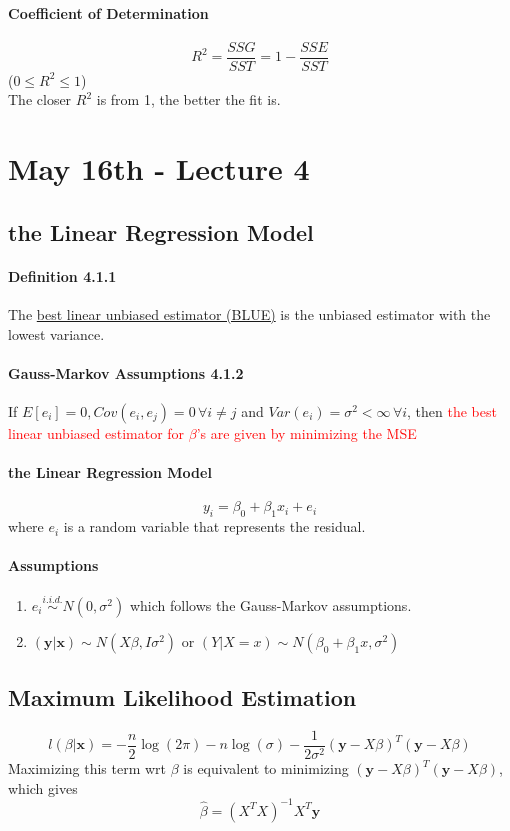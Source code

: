 \documentclass[11pt]{article}
\newcommand{\tb}[1]{\textbf{#1}}
\newcommand{\under}[1]{\underline{#1}}
\newcommand{\vx}[0]{\tb{x}}
\newcommand{\vy}[0]{\tb{y}}
\begin{document}
\paragraph{Coefficient of Determination}
$$R^2 = \frac{SSG}{SST} = 1- \frac{SSE}{SST}$$
($0 \leq R^2 \leq 1$)\\
The closer $R^2$ is from 1, the better the fit is.
\section{May 16th - Lecture 4}
\subsection{the Linear Regression Model}
\paragraph{Definition 4.1.1}
The \under{best linear unbiased estimator (BLUE)} is the unbiased estimator with the lowest variance.
\paragraph{Gauss-Markov Assumptions 4.1.2}
If $E[e_i] = 0, Cov(e_i, e_j) = 0 \, \forall i \neq j$ and $Var(e_i) = \sigma^2 < \infty \, \forall i$, then \textcolor{red}{the best linear unbiased estimator for $\beta$'s are given by minimizing the MSE}
\paragraph{the Linear Regression Model}
$$y_i = \beta_0 + \beta_1x_i + e_i$$
where $e_i$ is a random variable that represents the residual. \\
\paragraph{Assumptions}
\begin{enumerate}
    \item $e_i \overset{i.i.d.}{\sim} N(0, \sigma^2)$ which follows the Gauss-Markov assumptions. 
    \item $(\vy|\vx) \sim N(X\beta, I\sigma^2)$ or $(Y|X = x) \sim N(\beta_0 + \beta_1x, \sigma^2)$
\end{enumerate}
\subsection{Maximum Likelihood Estimation}
$$l(\beta | \vx) = -\frac{n}{2}\log(2\pi) - n\log(\sigma) - \frac{1}{2\sigma^2} (\vy - X \beta)^T(\vy - X\beta)$$
Maximizing this term wrt $\beta$ is equivalent to minimizing $(\vy - X\beta)^T(\vy-X\beta)$, which gives $$\hat{\beta} = (X^TX)^{-1}X^T\vy$$
\end{document}

